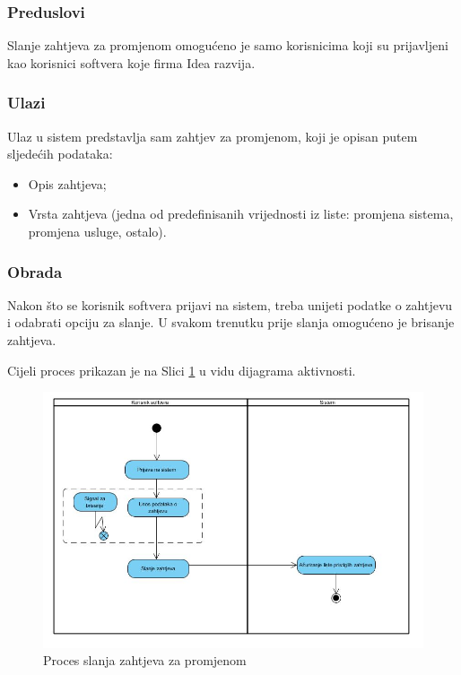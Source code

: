 \documentclass[12pt,a4paper]{article}
\begin{document}
\subsubsection{Preduslovi}

Slanje zahtjeva za promjenom omogućeno je samo korisnicima koji su prijavljeni kao korisnici softvera koje firma Idea razvija.

\subsubsection{Ulazi}

Ulaz u sistem predstavlja sam zahtjev za promjenom, koji je opisan putem sljedećih podataka:

\begin{itemize}
\item Opis zahtjeva;
\item Vrsta zahtjeva (jedna od predefinisanih vrijednosti iz liste: promjena sistema, promjena usluge, ostalo).
\end{itemize}

\subsubsection{Obrada}

Nakon što se korisnik softvera prijavi na sistem, treba unijeti podatke o zahtjevu i odabrati opciju za slanje. U svakom trenutku prije slanja omogućeno je brisanje zahtjeva.

Cijeli proces prikazan je na Slici \ref{act3} u vidu dijagrama aktivnosti.

\begin{figure}[H]
\center
\includegraphics[scale=0.5]{../res/Activity/activity3.JPG}
\caption{Proces slanja zahtjeva za promjenom}
\label{act3}
\end{figure}
\end{document}
